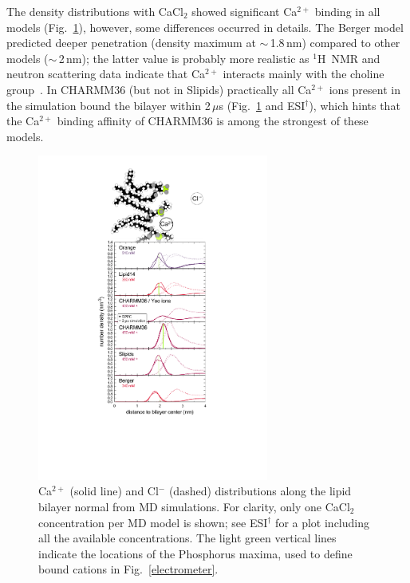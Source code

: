 \documentclass[twoside,twocolumn,9pt]{article}
\begin{document}
The density distributions with CaCl$_2$ showed significant
Ca$^{2+}$ binding in all models (Fig.~\ref{CAdensitiesCLEAR}), however, some differences occurred in details.
The Berger model predicted deeper penetration (density maximum at $\sim$\,1.8\,nm) compared
to other models ($\sim$\,2\,nm); the latter value is probably more realistic 
as $^1$H~NMR and neutron scattering data indicate that Ca$^{2+}$ interacts mainly with the 
choline group~\cite{hauser76,hauser78,herbette84,cevc90}. In CHARMM36 (but not in Slipids) practically all Ca$^{2+}$
ions present in the simulation bound the bilayer within 2\,$\mu$s (Fig.~\ref{CAdensitiesCLEAR} and ESI$^\dag$), which hints
that the Ca$^{2+}$ binding affinity of CHARMM36 is among the strongest of these models.
\begin{figure}[!h]
  \centering
  \includegraphics[width=7.6cm]{../Fig/CaDensities_withSnap.pdf}
  \caption{\label{CAdensitiesCLEAR}
    Ca$^{2+}$ (solid line) and Cl$^-$ (dashed) distributions along the lipid bi\-layer normal from MD simulations.
    For clarity, only one CaCl$_2$ concentration per MD model is shown;
    see ESI$^\dag$ for a plot including all the available concentrations.
    The light green vertical lines indicate the locations of the Phosphorus maxima,
    used to define bound cations in Fig.~\ref{electrometer}.
  }
\end{figure}
\end{document}
